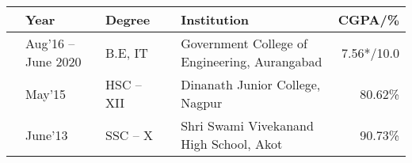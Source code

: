 \vspace{1mm}
\newcommand{\education}[4]{
  & #1 & #2 & & #3 & #4
}
\begin{center}
\begin{tabular}{ | L{0.05cm} l | L{3cm} | L{0.05cm} C{7cm} | r |}
  \hline
  \education{\textbf{Year}}{\textbf{Degree}}{\textbf{Institution}}{\textbf{CGPA/\%}}\\
  \hline
  \education{Aug'16 -- June 2020}{B.E, IT}{Government College of Engineering, Aurangabad}{7.56*/10.0}\\
  \education{May'15}{HSC -- XII}{Dinanath Junior College, Nagpur}{80.62\%}\\
  \education{June'13}{SSC -- X}{Shri Swami Vivekanand High School, Akot }{90.73\%}\\
  \hline
\end{tabular}
\end{center}


